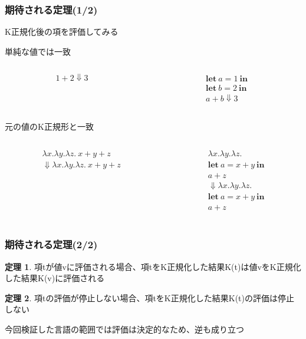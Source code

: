 \documentclass[dvipdfmx,cjk,xcolor=dvipsnames,envcountsect,notheorems,12pt]{beamer}
\theoremstyle{definition}
\newtheorem{theorem}{定理}
\newcommand{\keyword}[1]{\mathbf{#1}}
\newcommand{\LET}{\keyword{let}}
\newcommand{\IN}{\keyword{in}}
\begin{document}
\begin{frame}
	\frametitle{期待される定理(1/2)}
	{\LARGE K正規化後の項を評価してみる}

	\vfill

	\Large 単純な値では一致
	{\normalsize \begin{columns}
		\begin{column}{0.4\textwidth}
			\[ 1+2\Downarrow 3 \]
		\end{column}
		\begin{column}{0.4\textwidth}
			\[ 
				\begin{array}{l}
					\LET~a = 1~\IN \\
					\LET~b = 2~\IN \\
					a + b\Downarrow 3
				\end{array}
			\]
		\end{column}
	\end{columns}}

	\vfill

	元の値のK正規形と一致
	{\normalsize \begin{columns}
		\begin{column}{0.4\textwidth}
			\[
				\begin{array}{l}
					\lambda x.\lambda y.\lambda z.~x+y+z\\
					\Downarrow \lambda x.\lambda y.\lambda z.~x+y+z
				\end{array}
			\]
		\end{column}
		\begin{column}{0.4\textwidth}
			\[ 
				\begin{array}{l}
					\lambda x.\lambda y.\lambda z.\\
					\LET~a = x+y~\IN \\
					a + z \\
					\Downarrow \lambda x.\lambda y.\lambda z.\\
					\LET~a = x+y~\IN \\
					a + z \\
				\end{array}
			\]
		\end{column}
	\end{columns}}
\end{frame}

\begin{frame}
	\frametitle{期待される定理(2/2)}
	{\Large
	\begin{theorem}
		項tが値vに評価される場合、項tをK正規化した結果K(t)は値vをK正規化した結果K(v)に評価される
	\end{theorem}
	\begin{theorem}
		項tの評価が停止しない場合、項tをK正規化した結果K(t)の評価は停止しない
	\end{theorem}}
	\Large 今回検証した言語の範囲では評価は決定的なため、逆も成り立つ

\end{frame}
\end{document}
